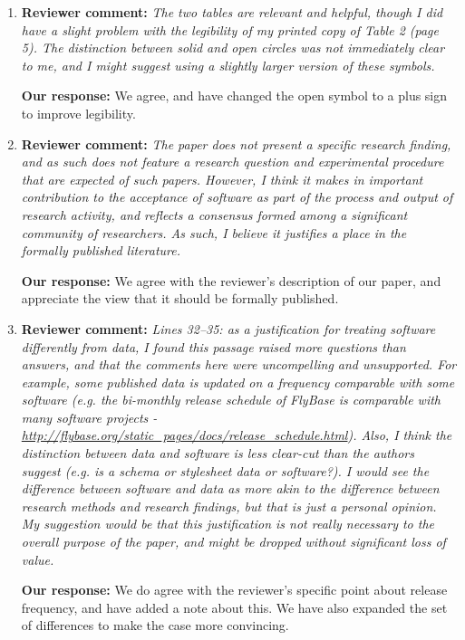 \documentclass{article}
\begin{document}
\begin{enumerate}

\item \textbf{Reviewer comment:}
\emph{The two tables are relevant and helpful, though I did have a slight problem with the legibility of my printed copy of Table 2 (page 5). The distinction between solid and open circles was not immediately clear to me, and I might suggest using a slightly larger version of these symbols.}

\textbf{Our response:}
We agree, and have changed the open symbol to a plus sign to improve legibility.


\item \textbf{Reviewer comment:}
\emph{The paper does not present a specific research finding, and as such does not feature a research question and experimental procedure that are expected of such papers. However, I think it makes in important contribution to the acceptance of software as part of the process and output of research activity, and reflects a consensus formed among a significant community of researchers. As such, I believe it justifies a place in the formally published literature.}

\textbf{Our response:}
We agree with the reviewer's description of our paper, and appreciate the view that it should be formally published.


\item \textbf{Reviewer comment:}
\emph{Lines 32--35: as a justification for treating software differently from data, I found this passage raised more questions than answers, and that the comments here were uncompelling and unsupported. For example, some published data is updated on a frequency comparable with some software (e.g. the bi-monthly release schedule of FlyBase is comparable with many software projects - \url{http://flybase.org/static_pages/docs/release_schedule.html}). Also, I think the distinction between data and software is less clear-cut than the authors suggest (e.g. is a schema or stylesheet data or software?). I would see the difference between software and data as more akin to the difference between research methods and research findings, but that is just a personal opinion. My suggestion would be that this justification is not really necessary to the overall purpose of the paper, and might be dropped without significant loss of value.}

\textbf{Our response:}
We do agree with the reviewer's specific point about release frequency, and have
added a note about this. We have also expanded the set of differences to make
the case more convincing.


\end{enumerate}
\end{document}
